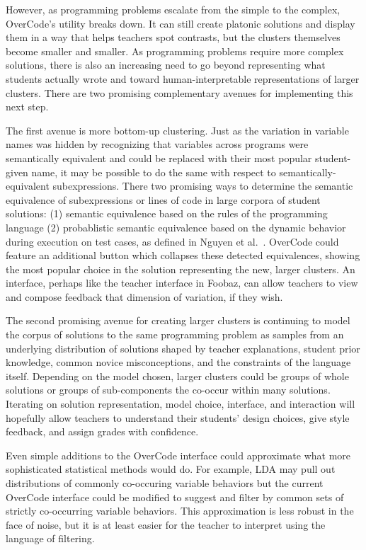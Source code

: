 However, as programming problems escalate from the simple to the complex, OverCode's utility breaks down. It can still create platonic solutions and display them in a way that helps teachers spot contrasts, but the clusters themselves become smaller and smaller. As programming problems require more complex solutions, there is also an increasing need to go beyond representing what students actually wrote and toward human-interpretable representations of larger clusters. There are two promising complementary avenues for implementing this next step.

The first avenue is more bottom-up clustering. Just as the variation in variable names was hidden by recognizing that variables across programs were semantically equivalent and could be replaced with their most popular student-given name, it may be possible to do the same with respect to semantically-equivalent subexpressions. There two promising ways to determine the semantic equivalence of subexpressions or lines of code in large corpora of student solutions: (1) semantic equivalence based on the rules of the programming language (2) probablistic semantic equivalence based on the dynamic behavior during execution on test cases, as defined in Nguyen et al.~\cite{codewebs}. OverCode could feature an additional button which collapses these detected equivalences, showing the most popular choice in the solution representing the new, larger clusters. An interface, perhaps like the teacher interface in Foobaz, can allow teachers to view and compose feedback that dimension of variation, if they wish. 

The second promising avenue for creating larger clusters is continuing to model the corpus of solutions to the same programming problem as samples from an underlying distribution of solutions shaped by teacher explanations, student prior knowledge, common novice misconceptions, and the constraints of the language itself. Depending on the model chosen, larger clusters could be groups of whole solutions or groups of sub-components the co-occur within many solutions. Iterating on solution representation, model choice, interface, and interaction will hopefully allow teachers to understand their students' design choices, give style feedback, and assign grades with confidence. 

Even simple additions to the OverCode interface could approximate what more sophisticated statistical methods would do. For example, LDA may pull out distributions of commonly co-occuring variable behaviors but the current OverCode interface could be modified to suggest and filter by common sets of strictly co-occurring variable behaviors. This approximation is less robust in the face of noise, but it is at least easier for the teacher to interpret using the language of filtering. %

